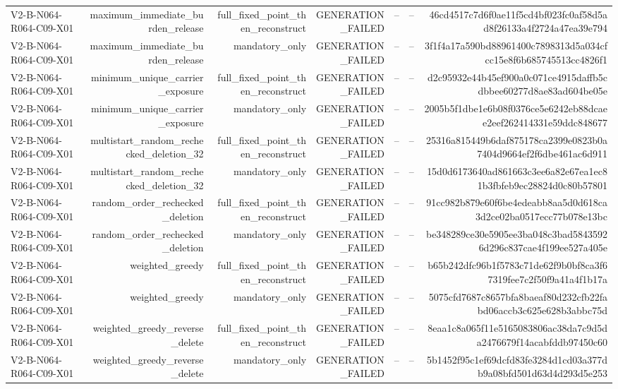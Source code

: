 {\begin{longtable}{lrrrrrr}
V2-B-N064-R064-C09-X01 & maximum\_immediate\_burden\_release & full\_fixed\_point\_then\_reconstruct & GENERATION\_FAILED & -- & -- & 46cd4517c7d6f0ae11f5cd4bf023fc0af58d5ad8f26133a4f2724a47ea39e794 \\
V2-B-N064-R064-C09-X01 & maximum\_immediate\_burden\_release & mandatory\_only & GENERATION\_FAILED & -- & -- & 3f1f4a17a590bd88961400c7898313d5a034cfcc15e8f6b685745513cc4826f1 \\
V2-B-N064-R064-C09-X01 & minimum\_unique\_carrier\_exposure & full\_fixed\_point\_then\_reconstruct & GENERATION\_FAILED & -- & -- & d2c95932e44b45ef900a0c071ce4915daffb5cdbbee60277d8ae83ad604be05e \\
V2-B-N064-R064-C09-X01 & minimum\_unique\_carrier\_exposure & mandatory\_only & GENERATION\_FAILED & -- & -- & 2005b5f1dbe1e6b08f0376ce5e6242eb88dcaee2eef262414331e59ddc848677 \\
V2-B-N064-R064-C09-X01 & multistart\_random\_rechecked\_deletion\_32 & full\_fixed\_point\_then\_reconstruct & GENERATION\_FAILED & -- & -- & 25316a815449b6daf875178ca2399e0823b0a7404d9664ef2f6dbe461ac6d911 \\
V2-B-N064-R064-C09-X01 & multistart\_random\_rechecked\_deletion\_32 & mandatory\_only & GENERATION\_FAILED & -- & -- & 15d0d6173640ad861663c3ee6a82e67ea1ec81b3fbfeb9ec28824d0c80b57801 \\
V2-B-N064-R064-C09-X01 & random\_order\_rechecked\_deletion & full\_fixed\_point\_then\_reconstruct & GENERATION\_FAILED & -- & -- & 91cc982b879e60f6be4edeabb8aa5d0d618ca3d2ce02ba0517ecc77b078e13bc \\
V2-B-N064-R064-C09-X01 & random\_order\_rechecked\_deletion & mandatory\_only & GENERATION\_FAILED & -- & -- & be348289ce30e5905ee3ba048c3bad58435926d296c837cae4f199ee527a405e \\
V2-B-N064-R064-C09-X01 & weighted\_greedy & full\_fixed\_point\_then\_reconstruct & GENERATION\_FAILED & -- & -- & b65b242dfc96b1f5783c71de62f9b0bf8ca3f67319fee7c2f50f9a41a4f1b17a \\
V2-B-N064-R064-C09-X01 & weighted\_greedy & mandatory\_only & GENERATION\_FAILED & -- & -- & 5075cfd7687c8657bfa8baeaf80d232cfb22fabd06accb3c625e628b3abbc75d \\
V2-B-N064-R064-C09-X01 & weighted\_greedy\_reverse\_delete & full\_fixed\_point\_then\_reconstruct & GENERATION\_FAILED & -- & -- & 8eaa1c8a065f11e5165083806ac38da7c9d5da2476679f14acabfddb97450c60 \\
V2-B-N064-R064-C09-X01 & weighted\_greedy\_reverse\_delete & mandatory\_only & GENERATION\_FAILED & -- & -- & 5b1452f95c1ef69dcfd83fe3284d1cd03a377db9a08bfd501d63d4d293d5e253 \\

\end{longtable}}

